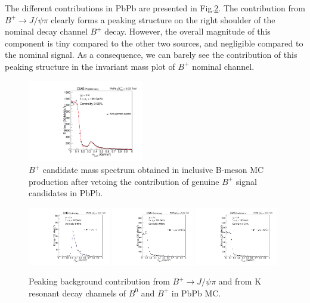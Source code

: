 The different contributions in PbPb are presented in Fig.\ref{BPNPPeak}.
The contribution from $B^+\rightarrow J/\psi \pi$ clearly forms a peaking structure on the right shoulder of the nominal decay channel $B^+$ decay. However, the overall magnitude of this component is tiny compared to the other two sources, and negligible compared to the nominal signal. As a consequence, we can barely see the contribution of this peaking structure in the invariant mass plot of $B^+$ nominal channel.

\begin{figure}[h]
\begin{center}
\includegraphics[width= 0.45\textwidth]{Figures/Chapter5/fitNP_PbPb.pdf}
\caption{$B^+$ candidate mass spectrum obtained in inclusive B-meson MC production after vetoing the contribution of genuine $B^+$ signal candidates in PbPb.}
\label{NPBP}
\end{center}
\end{figure}

\begin{figure}[h]
\begin{center}
\includegraphics[width= 0.32\textwidth]{Figures/Chapter5/BmassBpPi.pdf}
\includegraphics[width= 0.32\textwidth]{Figures/Chapter5/BmassBpK_tkmatch.pdf}
\includegraphics[width= 0.32\textwidth]{Figures/Chapter5/BmassB0K_tkmatch.pdf}
\caption{Peaking background contribution from $B^+\rightarrow J/\psi \pi$ and from K resonant decay channels of $B^0$ and $B^+$ in PbPb MC.}
\label{BPNPPeak}
\end{center}
\end{figure}

